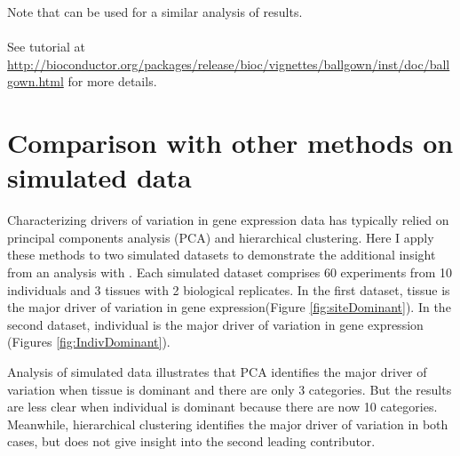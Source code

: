 \documentclass[12pt]{article}\usepackage[]{graphicx}\usepackage[]{xcolor}
\begin{document}
Note that  can be used for a similar analysis of  results.\\
\\
See tutorial at \url{http://bioconductor.org/packages/release/bioc/vignettes/ballgown/inst/doc/ballgown.html} for more details.


\pagebreak
\section{Comparison with other methods on simulated data}

Characterizing drivers of variation in gene expression data has typically relied on principal components analysis (PCA) and hierarchical clustering.  Here I apply these methods to two simulated datasets to demonstrate the additional insight from an analysis with .  Each simulated dataset comprises 60 experiments from 10 individuals and 3 tissues with 2 biological replicates.  In the first dataset, tissue is the major driver of variation in gene expression(Figure \ref{fig:siteDominant}).  In the second dataset, individual is the major driver of variation in gene expression (Figures \ref{fig:IndivDominant}).

Analysis of simulated data illustrates that PCA identifies the major driver of variation when tissue is dominant and there are only 3 categories.  But the results are less clear when individual is dominant because there are now 10 categories.  Meanwhile, hierarchical clustering identifies the major driver of variation in both cases, but does not give insight into the second leading contributor.
\end{document}
